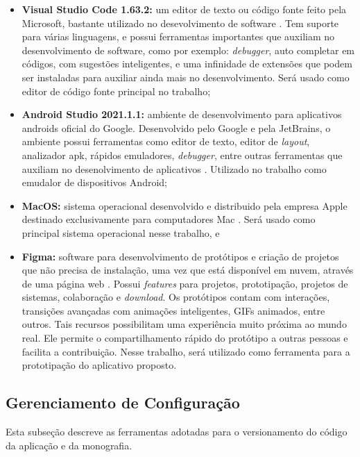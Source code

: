 \begin{itemize}

    \item \textbf{Visual Studio Code 1.63.2: }um editor de texto ou código fonte feito pela Microsoft, 
	bastante utilizado no desevolvimento de software \cite{vscode2015}. Tem suporte 
	para várias linguagens, e possui ferramentas importantes que auxiliam no 
	desenvolvimento de software, como por exemplo: \emph{debugger}, auto completar em 
	códigos, com sugestões inteligentes, e uma infinidade de extensões que podem ser instaladas para auxiliar ainda mais no desenvolvimento. Será usado como editor de código fonte principal no trabalho;
    \item \textbf{Android Studio 2021.1.1: }ambiente de desenvolvimento para 
	aplicativos androids oficial do Google. Desenvolvido pelo Google e pela 
	JetBrains, o ambiente possui ferramentas como editor de texto, editor de \emph{layout}, 
	analizador apk, rápidos emuladores, \emph{debugger}, entre outras ferramentas 
	que auxiliam no desenolvimento de aplicativos \cite{android2020}. Utilizado no 
	trabalho como emudalor de dispositivos Android;
    \item \textbf{MacOS: }sistema operacional desenvolvido e distribuido pela empresa Apple
	destinado exclusivamente para computadores Mac \cite{apple}. 
	Será usado como principal sistema operacional nesse trabalho, e
	\item \textbf{Figma: }software para desenvolvimento de protótipos e 
	criação de projetos que não precisa de instalação, uma vez que está disponível 
	em nuvem, através de uma página web \cite{figma2020}. Possui \emph{features} para projetos, prototipação, 
	projetos de sistemas, colaboração e \emph{download}. Os protótipos contam com 
	interações, transições avançadas com animações inteligentes, GIFs animados, 
	entre outros. Tais recursos possibilitam uma experiência muito próxima ao mundo 
	real. Ele permite o compartilhamento rápido do protótipo a outras pessoas e 
	facilita a contribuição. Nesse trabalho, será utilizado como ferramenta para a 
	prototipação do aplicativo proposto. 

\end{itemize}

\subsection{Gerenciamento de Configuração}

Esta subseção descreve as ferramentas adotadas para o versionamento do código da aplicação e da monografia.

